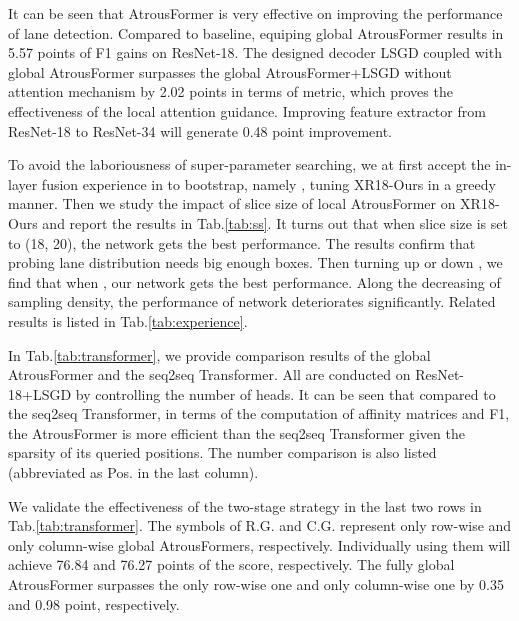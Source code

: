 \documentclass[preprint,12pt,review]{elsarticle}
\begin{document}
It can be seen that AtrousFormer is very effective on improving the performance of lane detection. Compared to baseline, equiping global AtrousFormer results in 5.57 points of F1 gains on ResNet-18. The designed decoder LSGD coupled with global AtrousFormer surpasses the global AtrousFormer+LSGD without attention mechanism by 2.02 points in terms of  metric, which proves the effectiveness of the local attention guidance. Improving feature extractor from ResNet-18 to ResNet-34 will generate 0.48 point improvement. 

 To avoid the laboriousness of super-parameter searching, we at first accept the in-layer fusion experience in \cite{resa} to bootstrap, namely , tuning XR18-Ours in a greedy manner. Then we study the impact of slice size of local AtrousFormer on XR18-Ours and report the results in Tab.\ref{tab:ss}. It turns out that when slice size is set to (18, 20), the network gets the best performance. The results confirm that probing lane distribution needs big enough boxes. Then turning up or down , we find that when , our network gets the best performance. Along the decreasing of sampling density, the performance of network deteriorates significantly. Related results is listed in Tab.\ref{tab:experience}.

 In Tab.\ref{tab:transformer}, we provide comparison results of the global AtrousFormer and the seq2seq Transformer. All are conducted on ResNet-18+LSGD by controlling the number of heads. It can be seen that compared to the seq2seq Transformer, in terms of the computation of affinity matrices and F1, the AtrousFormer is more efficient than the seq2seq Transformer given the sparsity of its queried positions. The number comparison is also listed (abbreviated as  Pos. in the last column). 

 We validate the effectiveness of the two-stage strategy in the last two rows in Tab.\ref{tab:transformer}. The symbols of R.G. and C.G. represent only row-wise and only column-wise global AtrousFormers, respectively. Individually using them will achieve 76.84 and 76.27 points of the  score, respectively. The fully global AtrousFormer surpasses the only row-wise one and only column-wise one by 0.35 and 0.98 point, respectively.
\end{document}
